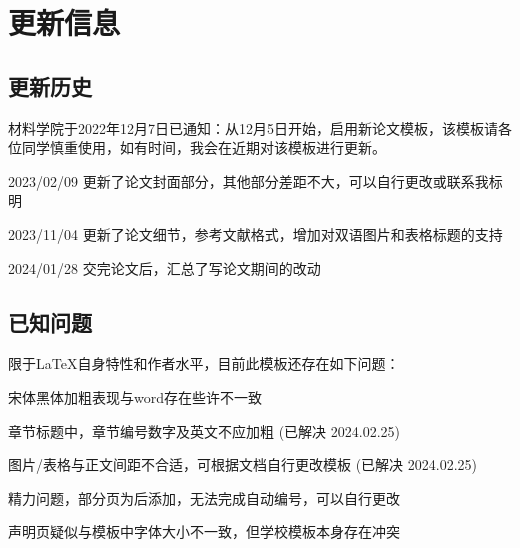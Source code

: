 \chapter{更新信息}
\section{更新历史}
材料学院于2022年12月7日已通知：从12月5日开始，启用新论文模板，该模板请各位同学慎重使用，如有时间，我会在近期对该模板进行更新。

2023/02/09 更新了论文封面部分，其他部分差距不大，可以自行更改或联系我标明

2023/11/04 更新了论文细节，参考文献格式，增加对双语图片和表格标题的支持

2024/01/28 交完论文后，汇总了写论文期间的改动

\section{已知问题}
限于\LaTeX 自身特性和作者水平，目前此模板还存在如下问题：

宋体黑体加粗表现与word存在些许不一致

章节标题中，章节编号数字及英文不应加粗 (已解决 2024.02.25)

图片/表格与正文间距不合适，可根据文档自行更改模板 (已解决 2024.02.25)

精力问题，部分页为后添加，无法完成自动编号，可以自行更改

声明页疑似与模板中字体大小不一致，但学校模板本身存在冲突